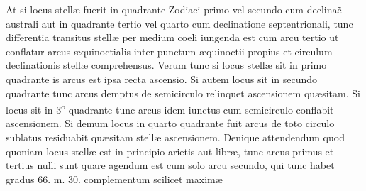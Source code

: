 \documentclass[11pt,a4paper]{article}
\begin{document}
At si locus stellæ fuerit in quadrante Zodiaci primo vel secundo cum declinaẽ australi aut in quadrante tertio vel quarto cum declinatione septentrionali, tunc differentia transitus stellæ per medium coeli iungenda est cum arcu tertio ut conflatur arcus æquinoctialis inter punctum æquinoctii propius et circulum declinationis stellæ comprehensus. Verum tunc si locus stellæ sit in primo quadrante is arcus est ipsa recta ascensio. Si autem locus sit in secundo quadrante tunc arcus demptus de semicirculo relinquet ascensionem quæsitam. Si locus sit in 3\textsuperscript{o} quadrante tunc arcus idem iunctus cum semicirculo conflabit ascensionem. Si demum locus in quarto quadrante fuit arcus de toto circulo sublatus residuabit quæsitam stellæ ascensionem. Denique attendendum quod quoniam locus stellæ est in principio arietis  aut libræ, tunc arcus primus et tertius nulli sunt quare agendum est cum solo arcu secundo, qui tunc habet gradus 66. m. 30. complementum scilicet maximæ
\end{document}
